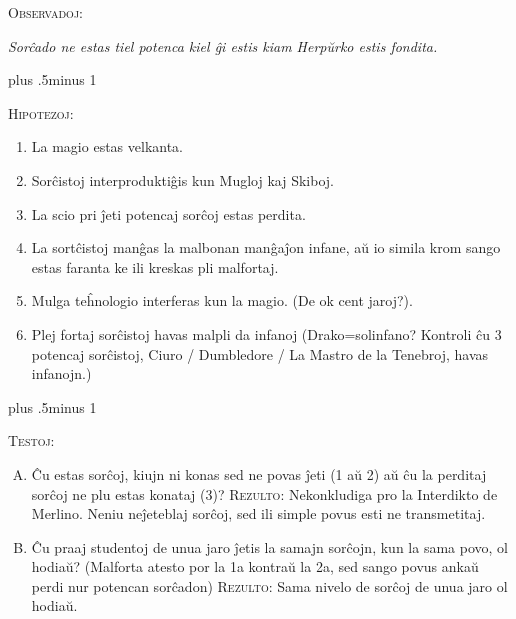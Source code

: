 \begin{centering}
\begin{samepage}
\scshape Observadoj:

\itshape Sorĉado ne estas tiel potenca kiel ĝi estis kiam Herpŭrko estis fondita. \end{samepage}

\baselineskip plus .5\textheight minus 1\baselineskip

\begin{samepage}
\scshape Hipotezoj:

\itshape
        \begin{enumerate}[1.]
                \firmlist
                \setlength{\leftmargin}{\parindent}
                \setlength{\rightmargin}{\parindent}
        \item La magio estas velkanta.
        \item Sorĉistoj interproduktiĝis kun Mugloj kaj Skiboj.
        \item La scio pri ĵeti potencaj sorĉoj estas perdita. 
        \item La sortĉistoj manĝas la malbonan manĝaĵon infane, aŭ io simila krom sango estas faranta ke ili kreskas pli malfortaj.
        \item Mulga teĥnologio interferas kun la magio. (De ok cent jaroj?).
        \item Plej fortaj sorĉistoj havas malpli da infanoj (Drako=solinfano? Kontroli ĉu 3 potencaj sorĉistoj, Ciuro / Dumbledore / La Mastro de la Tenebroj, havas infanojn.)
        \end{enumerate}
\end{samepage}

\baselineskip plus .5\textheight minus 1\baselineskip

\begin{samepage}
\scshape Testoj:
\itshape
        \begin{enumerate}[A.]{
                \firmlist
                \setlength{\leftmargin}{\parindent}
                \setlength{\rightmargin}{1cm}}
        \item Ĉu estas sorĉoj, kiujn ni konas sed ne povas ĵeti (1 aŭ 2) aŭ ĉu la perditaj sorĉoj ne plu estas konataj (3)? {\scshape Rezulto:} Nekonkludiga pro la Interdikto de Merlino. Neniu neĵeteblaj sorĉoj, sed ili simple povus esti ne transmetitaj.

        \item Ĉu praaj studentoj de unua jaro ĵetis la samajn sorĉojn, kun la sama povo, ol hodiaŭ? (Malforta atesto por la 1a kontraŭ la 2a, sed sango povus ankaŭ perdi nur potencan sorĉadon) {\scshape Rezulto:} Sama nivelo de sorĉoj de unua jaro ol hodiaŭ. 


\end{enumerate}
\end{samepage}
\end{centering}
